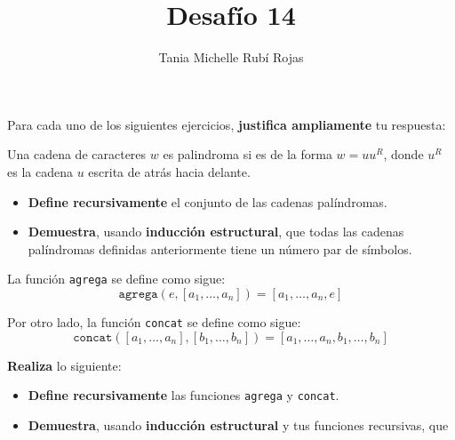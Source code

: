 \documentclass[oneside]{style}
\title{Desafío 14}
\author{Tania Michelle Rubí Rojas}
\begin{document}
\maketitle

Para cada uno de los siguientes ejercicios, \textbf{justifica ampliamente} tu 
respuesta:

\begin{questions}[label=\protect\circled{\bfseries\arabic*}]
    \question
    {
        Una cadena de caracteres $w$ es palindroma si es de la forma 
        $w = uu^R$, donde $u^R$ es la cadena $u$ escrita de atrás hacia 
        delante. 

        \begin{itemize}
            \item \textbf{Define recursivamente} el conjunto de las cadenas 
            palíndromas. 

            \item \textbf{Demuestra}, usando \textbf{inducción estructural}, 
            que todas las cadenas palíndromas definidas anteriormente tiene 
            un número par de símbolos.  
        \end{itemize}
    }

    \question
    {
        La función \texttt{agrega} se define como sigue:
        \begin{equation*}
            \texttt{agrega}(e, [a_1, \ldots, a_n]) = 
            [a_1, \ldots, a_n, e]
        \end{equation*}

        Por otro lado, la función \texttt{concat} se define como sigue:
        \begin{equation*}
            \texttt{concat}([a_1, \ldots, a_n], [b_1, \ldots, b_n]) = 
            [a_1, \ldots, a_n, b_1, \ldots, b_n]
        \end{equation*}

        \textbf{Realiza} lo siguiente:
        \begin{itemize}
            \item \textbf{Define recursivamente} las funciones 
            \texttt{agrega} y \texttt{concat}. 

            \item \textbf{Demuestra}, usando \textbf{inducción estructural} y 
            tus funciones recursivas, que 
            \begin{center}
            \end{center}
        \end{itemize}
    }


\end{questions}
\end{document}
